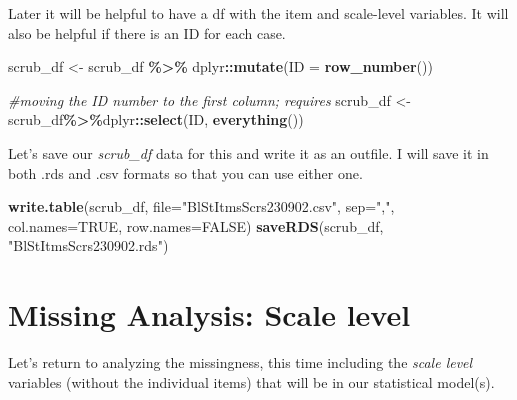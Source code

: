 \documentclass[
  11pt,
]{book}
\newenvironment{Shaded}{\begin{snugshade}}{\end{snugshade}}
\newcommand{\AttributeTok}[1]{\textcolor[rgb]{0.27,0.27,0.27}{#1}}
\newcommand{\CommentTok}[1]{\textcolor[rgb]{0.37,0.37,0.37}{\textit{#1}}}
\newcommand{\ConstantTok}[1]{\textcolor[rgb]{0.37,0.37,0.37}{#1}}
\newcommand{\FunctionTok}[1]{\textcolor[rgb]{0.27,0.27,0.27}{\textbf{#1}}}
\newcommand{\NormalTok}[1]{#1}
\newcommand{\OtherTok}[1]{\textcolor[rgb]{0.37,0.37,0.37}{#1}}
\newcommand{\SpecialCharTok}[1]{\textcolor[rgb]{0.43,0.43,0.43}{\textbf{#1}}}
\newcommand{\StringTok}[1]{\textcolor[rgb]{0.5,0.5,0.5}{#1}}
\begin{document}
Later it will be helpful to have a df with the item and scale-level variables. It will also be helpful if there is an ID for each case.

\begin{Shaded}
\begin{Highlighting}[]
\NormalTok{scrub\_df }\OtherTok{\textless{}{-}}\NormalTok{ scrub\_df }\SpecialCharTok{\%\textgreater{}\%}\NormalTok{ dplyr}\SpecialCharTok{::}\FunctionTok{mutate}\NormalTok{(}\AttributeTok{ID =} \FunctionTok{row\_number}\NormalTok{())}

\CommentTok{\#moving the ID number to the first column; requires }
\NormalTok{scrub\_df }\OtherTok{\textless{}{-}}\NormalTok{ scrub\_df}\SpecialCharTok{\%\textgreater{}\%}\NormalTok{dplyr}\SpecialCharTok{::}\FunctionTok{select}\NormalTok{(ID, }\FunctionTok{everything}\NormalTok{())}
\end{Highlighting}
\end{Shaded}

Let's save our \emph{scrub\_df} data for this and write it as an outfile. I will save it in both .rds and .csv formats so that you can use either one.

\begin{Shaded}
\begin{Highlighting}[]
\FunctionTok{write.table}\NormalTok{(scrub\_df, }\AttributeTok{file=}\StringTok{"BlStItmsScrs230902.csv"}\NormalTok{, }\AttributeTok{sep=}\StringTok{","}\NormalTok{, }\AttributeTok{col.names=}\ConstantTok{TRUE}\NormalTok{, }\AttributeTok{row.names=}\ConstantTok{FALSE}\NormalTok{)}
\FunctionTok{saveRDS}\NormalTok{(scrub\_df, }\StringTok{"BlStItmsScrs230902.rds"}\NormalTok{)}
\end{Highlighting}
\end{Shaded}

\hypertarget{missing-analysis-scale-level}{%
\section{Missing Analysis: Scale level}\label{missing-analysis-scale-level}}

Let's return to analyzing the missingness, this time including the \emph{scale level} variables (without the individual items) that will be in our statistical model(s).
\end{document}
